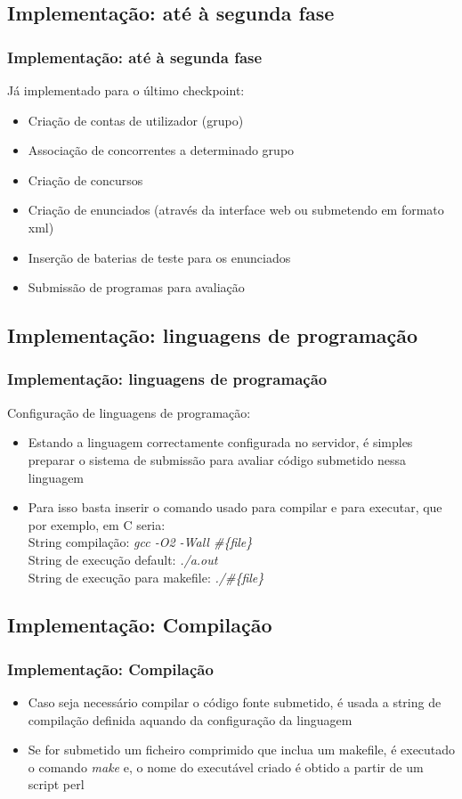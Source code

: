 \documentclass{beamer}
\begin{document}
\subsection{Implementação: até à segunda fase}
\begin{frame} \frametitle{Implementação: até à segunda fase}
Já implementado para o último checkpoint:
\begin{itemize}
\item Criação de contas de utilizador (grupo)
\item Associação de concorrentes a determinado grupo
\item Criação de concursos
\item Criação de enunciados (através da interface web ou submetendo em formato xml)
\item Inserção de baterias de teste para os enunciados
\item Submissão de programas para avaliação
\end{itemize}
\end{frame}

\subsection{Implementação: linguagens de programação}
\begin{frame} \frametitle{Implementação: linguagens de programação}
Configuração de linguagens de programação:
\begin{itemize}
\item Estando a linguagem correctamente configurada no servidor, é 
simples preparar o sistema de submissão para avaliar código submetido nessa linguagem
\item Para isso basta inserir o comando usado para compilar e para executar, que por exemplo, em C seria:\\
String compilação: \textit{gcc -O2 -Wall \#\{file\}}\\
String de execução default: \textit{./a.out}\\
String de execução para makefile: \textit{./\#\{file\}}
\end{itemize}
\end{frame}

\subsection{Implementação: Compilação}
\begin{frame} \frametitle{Implementação: Compilação}
\begin{itemize}
\item Caso seja necessário compilar o código fonte submetido, é usada a string de compilação definida
aquando da configuração da linguagem
\item Se for submetido um ficheiro comprimido que inclua um makefile, é executado o comando \textit{make} e, 
o nome do executável criado é obtido a partir de um script perl
\end{itemize}
\end{frame}
\end{document}
